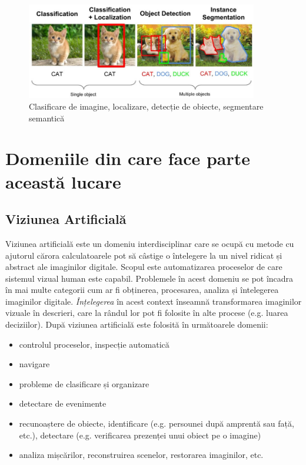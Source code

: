 \begin{figure}[h!]
    	\centering
	\captionsetup{justification=centering, margin=2cm}
	\includegraphics[width=0.9\textwidth]{figures/class_detect_segment.jpeg}
	\caption{Clasificare de imagine, localizare, detecție de obiecte, segmentare semantică \cite{class_detect_segment}}
	\label{fig:class_detect_semgent}
\end{figure}
\section{Domeniile din care face parte această lucare}
\subsection{Viziunea Artificială}
Viziunea artificială este un domeniu interdisciplinar care se ocupă cu metode cu ajutorul cărora calculatoarele pot să câstige o întelegere la un nivel ridicat și abstract ale imaginilor digitale. Scopul este automatizarea proceselor de care sistemul vizual human este capabil.\newline
Problemele în acest domeniu se pot încadra în mai multe categorii cum ar fi obținerea, procesarea, analiza și întelegerea imaginilor digitale. \textit{Înțelegerea} în acest context înseamnă transformarea imaginilor vizuale în descrieri, care la rândul lor pot fi folosite în alte procese (e.g. luarea deciziilor). După \cite{Szeliski10computervision} viziunea artificială este folosită în următoarele domenii:
\begin{itemize}
	\item controlul proceselor, inspecție automatică
	\item navigare
	\item probleme de clasificare și organizare
	\item detectare de evenimente
	\item recunoaștere de obiecte, identificare (e.g. persounei după amprentă sau față, etc.), detectare (e.g. verificarea prezenței unui obiect pe o imagine)
	\item analiza mișcărilor, reconstruirea scenelor, restorarea imaginilor, etc.
\end{itemize}

